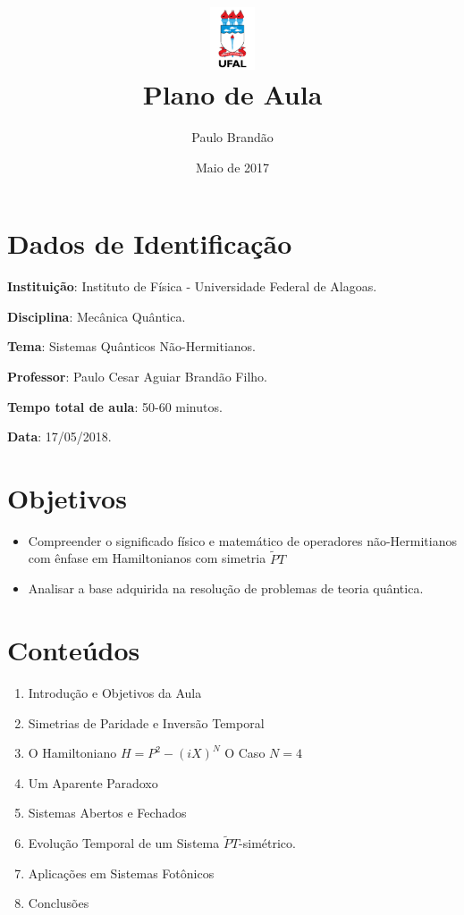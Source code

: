 \documentclass{article}
\title{\includegraphics[width=0.1\textwidth]{ufallogo.png} \\
\Huge{\color{astral}\textbf{Plano de Aula}}}
\author{Paulo Brandão}
\date{Maio de 2017}
\begin{document}
\maketitle

\section{Dados de Identificação}

\noindent \textbf{Instituição}: Instituto de Física - Universidade Federal de Alagoas.

\noindent \textbf{Disciplina}: Mecânica Quântica.

\noindent \textbf{Tema}: Sistemas Quânticos Não-Hermitianos.

\noindent \textbf{Professor}: Paulo Cesar Aguiar Brandão Filho.

\noindent \textbf{Tempo total de aula}: 50-60 minutos.

\noindent \textbf{Data}: 17/05/2018.

\section{Objetivos}

\begin{itemize}
    \item Compreender o significado físico e matemático de operadores não-Hermitianos com ênfase em Hamiltonianos com simetria $\tilde{P}T$
    \item Analisar a base adquirida na resolução de problemas de teoria quântica.
\end{itemize}

\section{Conteúdos}

\begin{enumerate}
    \item Introdução e Objetivos da Aula
    \item Simetrias de Paridade e Inversão Temporal
    \item O Hamiltoniano $H = P^2 -(iX)^N$
     O Caso $N = 4$ 
    \item Um Aparente Paradoxo
    \item Sistemas Abertos e Fechados
    \item Evolução Temporal de um Sistema $\tilde{P}T$-simétrico.
    \item Aplicações em Sistemas Fotônicos
    \item Conclusões
\end{enumerate}
\end{document}
